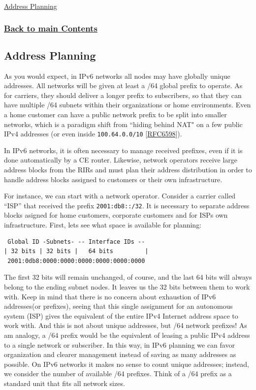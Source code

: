 \documentclass[
]{article}
\begin{document}
\hyperref[address-planning]{Address Planning}

\subsubsection{\texorpdfstring{\hyperref[list-of-contents]{Back to main
Contents}}{Back to main Contents}}\label{back-to-main-contents-4}

\pagebreak

\subsection{Address Planning}\label{address-planning}

As you would expect, in IPv6 networks all nodes may have globally unique
addresses. All networks will be given at least a /64 global prefix to
operate. As for carriers, they should deliver a longer prefix to
subscribers, so that they can have multiple /64 subnets within their
organizations or home environments. Even a home customer can have a
public network prefix to be split into smaller networks, which is a
paradigm shift from ``hiding behind NAT" on a few public IPv4 addresses
(or even inside \texttt{100.64.0.0/10}
{[}\href{https://www.rfc-editor.org/info/rfc6598}{RFC6598}{]}).

In IPv6 networks, it is often necessary to manage received prefixes,
even if it is done automatically by a CE router. Likewise, network
operators receive large address blocks from the RIRs and must plan their
address distribution in order to handle address blocks assigned to
customers or their own infrastructure.

For instance, we can start with a network operator. Consider a carrier
called ``ISP'' that received the prefix \texttt{2001:db8::/32}. It is
necessary to separate address blocks asigned for home customers,
corporate customers and for ISP\textquotesingle s own infrastructure.
First, let\textquotesingle s see what space is available for planning:

\begin{verbatim}
 Global ID -Subnets- -- Interface IDs --
| 32 bits | 32 bits |   64 bits         |
 2001:0db8:0000:0000:0000:0000:0000:0000
\end{verbatim}

The first 32 bits will remain unchanged, of course, and the last 64 bits
will always belong to the ending subnet nodes. It leaves us the 32 bits
between them to work with. Keep in mind that there is no concern about
exhaustion of IPv6 addresses(or prefixes), seeing that this single
assignment for an autonomous system (ISP) gives the equivalent of the
entire IPv4 Internet address space to work with. And this is not about
unique addresses, but /64 network prefixes! As am analogy, a /64 prefix
would be the equivalent of leasing a public IPv4 address to a single
network or subscriber. In this way, in IPv6 planning we can favor
organization and clearer management instead of saving as many addresses
as possible. On IPv6 networks it makes no sense to count unique
addresses; instead, we consider the number of available /64 prefixes.
Think of a /64 prefix as a standard unit that fits all network sizes.
\end{document}
